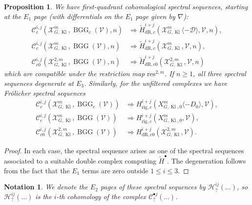 \documentclass[cjm]{ipart}
\theoremstyle{plain}
\newtheorem{proposition}[theorem]{Proposition}
\newtheorem{notation}[theorem]{Notation}
\theoremstyle{remark}
\DeclareMathOperator{\BGG}{BGG}
\DeclareMathOperator{\Kl}{Kl}
\newcommand{\cD}{\mathcal{D}}
\newcommand{\cH}{\mathcal{H}}
\newcommand{\cV}{\mathcal{V}}
\newcommand{\cX}{\mathcal{X}}
\newcommand{\dR}{\mathrm{dR}}
\newcommand{\res}{\mathrm{res}}
\newcommand{\rig}{\mathrm{rig}}
\newcommand{\sC}{\mathscr{C}}
\newcommand{\wH}{\widetilde{H}}
\numberwithin{equation}{subsection}
\renewcommand{\le}{\leqslant}
\renewcommand{\ge}{\geqslant}
\begin{document}
  \begin{proposition}
   We have first-quadrant cohomological spectral sequences, starting at the $E_1$ page (with differentials on the $E_1$ page given by $\nabla$):
   \begin{align}
   \sC^{i,j}_{c}(\cX_{G,\Kl}^m,\BGG_c(\cV), n)  & \Rightarrow \wH^{i+j}_{\dR,c}(\cX_{G,\Kl}^m\langle -\cD\rangle,\cV,n),\label{eq:wssgeq1minusD}\\
   \sC^{i,j}_{c}(\cX_{G,\Kl}^m,\BGG(\cV), n)  & \Rightarrow \wH^{i+j}_{\dR,c}(\cX_{G,\Kl}^m,\cV,n),\label{eq:wssgeq1}\\
   \sC^{i,j}_{c0}(\cX_{G,\Kl}^{2,m},\BGG(\cV), n)  & \Rightarrow \wH^{i+j}_{\dR,c0}(\cX_{G,\Kl}^{2,m},\cV,n) \label{eq:wssord}
   \end{align}
   which are compatible under the restriction map $\res^{2,m}$. If $n \ge 1$, all three spectral sequences degenerate at $E_3$. Similarly, for the unfiltered complexes we have Fr\"olicher spectral sequences
   \begin{align}
   \sC^{i,j}_{c}(\cX_{G,\Kl}^m,\BGG_c(\cV))  & \Rightarrow H^{i+j}_{\rig,c}(X_{G,\Kl,0}^m\langle -D_0\rangle,\cV),\label{eq:ssgeq1minusD}\\
   \sC^{i,j}_{c}(\cX_{G,\Kl}^m,\BGG(\cV))  & \Rightarrow H^{i+j}_{\rig,c}(X_{G,\Kl,0}^m,\cV),\label{eq:ssgeq1}\\
   \sC^{i,j}_{c0}(\cX_{G,\Kl}^{2,m},\BGG(\cV))  & \Rightarrow H^{i+j}_{\dR,c0}(\cX_{G,\Kl}^{2,m},\cV). \label{eq:ssord}
   \end{align}
  \end{proposition}

  \begin{proof}
   In each case, the spectral sequence arises as one of the spectral sequences associated to a suitable double complex computing $\wH^\bullet$. The degeneration follows from the fact that the $E_1$ terms are zero outside $1 \le i \le 3$.
  \end{proof}

  \begin{notation}
   We denote the $E_2$ pages of these spectral sequences by $\cH^{ij}_{?}(\dots)$, so $\cH^{ij}_?(\dots)$ is the $i$-th cohomology of the complex $\sC^{\bullet j}_{?}(\dots)$.
  \end{notation}
\end{document}
